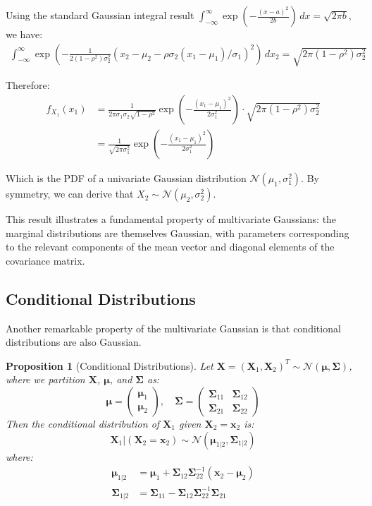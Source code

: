 \documentclass{article}
\newtheorem{proposition}[theorem]{Proposition}
\begin{document}
Using the standard Gaussian integral result $\int_{-\infty}^{\infty} \exp(-\frac{(x-a)^2}{2b}) \, dx = \sqrt{2\pi b}$, we have:
\begin{align*}
\int_{-\infty}^{\infty} \exp\left(-\frac{1}{2(1-\rho^2)\sigma_2^2}(x_2-\mu_2 - \rho\sigma_2(x_1-\mu_1)/\sigma_1)^2\right) \, dx_2 = \sqrt{2\pi (1-\rho^2) \sigma_2^2}
\end{align*}

Therefore:
\begin{align*}
f_{X_1}(x_1) &= \frac{1}{2\pi\sigma_1\sigma_2\sqrt{1-\rho^2}} \exp\left(-\frac{(x_1-\mu_1)^2}{2\sigma_1^2}\right) \cdot \sqrt{2\pi (1-\rho^2) \sigma_2^2}\\
&= \frac{1}{\sqrt{2\pi\sigma_1^2}} \exp\left(-\frac{(x_1-\mu_1)^2}{2\sigma_1^2}\right)
\end{align*}

Which is the PDF of a univariate Gaussian distribution $\mathcal{N}(\mu_1, \sigma_1^2)$. By symmetry, we can derive that $X_2 \sim \mathcal{N}(\mu_2, \sigma_2^2)$.

This result illustrates a fundamental property of multivariate Gaussians: the marginal distributions are themselves Gaussian, with parameters corresponding to the relevant components of the mean vector and diagonal elements of the covariance matrix.

\subsection{Conditional Distributions}

Another remarkable property of the multivariate Gaussian is that conditional distributions are also Gaussian.

\begin{proposition}[Conditional Distributions]
Let $\mathbf{X} = (\mathbf{X}_1, \mathbf{X}_2)^T \sim \mathcal{N}(\boldsymbol{\mu}, \boldsymbol{\Sigma})$, where we partition $\mathbf{X}$, $\boldsymbol{\mu}$, and $\boldsymbol{\Sigma}$ as:
\[
\boldsymbol{\mu} = \begin{pmatrix} \boldsymbol{\mu}_1 \\ \boldsymbol{\mu}_2 \end{pmatrix}, \quad
\boldsymbol{\Sigma} = \begin{pmatrix} \boldsymbol{\Sigma}_{11} & \boldsymbol{\Sigma}_{12} \\ \boldsymbol{\Sigma}_{21} & \boldsymbol{\Sigma}_{22} \end{pmatrix}
\]
Then the conditional distribution of $\mathbf{X}_1$ given $\mathbf{X}_2 = \mathbf{x}_2$ is:
\[
\mathbf{X}_1 | (\mathbf{X}_2 = \mathbf{x}_2) \sim \mathcal{N}(\boldsymbol{\mu}_{1|2}, \boldsymbol{\Sigma}_{1|2})
\]
where:
\begin{align*}
\boldsymbol{\mu}_{1|2} &= \boldsymbol{\mu}_1 + \boldsymbol{\Sigma}_{12}\boldsymbol{\Sigma}_{22}^{-1}(\mathbf{x}_2 - \boldsymbol{\mu}_2) \\
\boldsymbol{\Sigma}_{1|2} &= \boldsymbol{\Sigma}_{11} - \boldsymbol{\Sigma}_{12}\boldsymbol{\Sigma}_{22}^{-1}\boldsymbol{\Sigma}_{21}
\end{align*}
\end{proposition}
\end{document}
